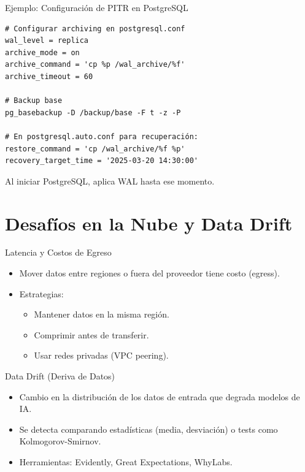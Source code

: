 \documentclass[aspectratio=169, 10pt, xcolor=table]{beamer}
\begin{document}
\begin{frame}[fragile]{Ejemplo: Configuración de PITR en PostgreSQL}
    \begin{lstlisting}[style=bashstyle]
# Configurar archiving en postgresql.conf
wal_level = replica
archive_mode = on
archive_command = 'cp %p /wal_archive/%f'
archive_timeout = 60

# Backup base
pg_basebackup -D /backup/base -F t -z -P

# En postgresql.auto.conf para recuperación:
restore_command = 'cp /wal_archive/%f %p'
recovery_target_time = '2025-03-20 14:30:00'
    \end{lstlisting}
    Al iniciar PostgreSQL, aplica WAL hasta ese momento.
\end{frame}

\section{Desafíos en la Nube y Data Drift}

\begin{frame}{Latencia y Costos de Egreso}
    \begin{itemize}
        \item Mover datos entre regiones o fuera del proveedor tiene costo (egress).
        \item Estrategias:
        \begin{itemize}
            \item Mantener datos en la misma región.
            \item Comprimir antes de transferir.
            \item Usar redes privadas (VPC peering).
        \end{itemize}
    \end{itemize}
\end{frame}

\begin{frame}{Data Drift (Deriva de Datos)}
    \begin{itemize}
        \item Cambio en la distribución de los datos de entrada que degrada modelos de IA.
        \item Se detecta comparando estadísticas (media, desviación) o tests como Kolmogorov-Smirnov.
        \item Herramientas: Evidently, Great Expectations, WhyLabs.
    \end{itemize}
\end{frame}
\end{document}
